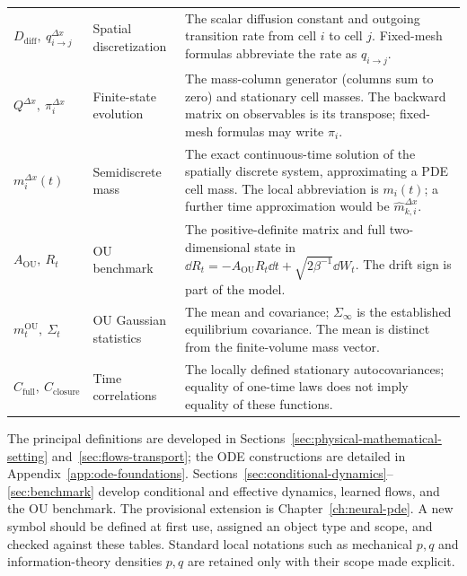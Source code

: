 \begin{longtable}{@{}>{\raggedright\arraybackslash}p{32mm}>{\raggedright\arraybackslash}p{26mm}>{\raggedright\arraybackslash}p{90mm}@{}}
$D_{\mathrm{diff}},\ q_{i\to j}^{\Delta x}$ & Spatial discretization & The scalar diffusion constant and outgoing transition rate from cell $i$ to cell $j$. Fixed-mesh formulas abbreviate the rate as $q_{i\to j}$.\\[3pt]
$Q^{\Delta x},\ \pi_i^{\Delta x}$ & Finite-state evolution & The mass-column generator (columns sum to zero) and stationary cell masses. The backward matrix on observables is its transpose; fixed-mesh formulas may write $\pi_i$.\\[3pt]
$m_i^{\Delta x}(t)$ & Semidiscrete mass & The exact continuous-time solution of the spatially discrete system, approximating a PDE cell mass. The local abbreviation is $m_i(t)$; a further time approximation would be $\widehat m_{k,i}^{\Delta x}$.\\[3pt]
$A_{\mathrm{OU}},\ R_t$ & OU benchmark & The positive-definite matrix and full two-dimensional state in $\dd R_t=-A_{\mathrm{OU}}R_t\dd t+\sqrt{2\beta^{-1}}\dd W_t$. The drift sign is part of the model.\\[3pt]
$m_t^{\mathrm{OU}},\ \Sigma_t$ & OU Gaussian statistics & The mean and covariance; $\Sigma_\infty$ is the established equilibrium covariance. The mean is distinct from the finite-volume mass vector.\\[3pt]
$C_{\mathrm{full}},\ C_{\mathrm{closure}}$ & Time correlations & The locally defined stationary autocovariances; equality of one-time laws does not imply equality of these functions.\\[3pt]
\end{longtable}
\addtocounter{table}{-1}
\endgroup

The principal definitions are developed in Sections~\ref{sec:physical-mathematical-setting} and~\ref{sec:flows-transport}; the ODE constructions are detailed in Appendix~\ref{app:ode-foundations}. Sections~\ref{sec:conditional-dynamics}--\ref{sec:benchmark} develop conditional and effective dynamics, learned flows, and the OU benchmark. The provisional extension is Chapter~\ref{ch:neural-pde}. A new symbol should be defined at first use, assigned an object type and scope, and checked against these tables. Standard local notations such as mechanical $p,q$ and information-theory densities $p,q$ are retained only with their scope made explicit.

